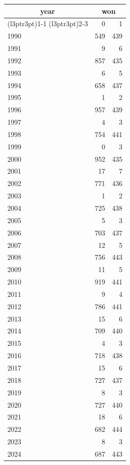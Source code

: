 \footnotesize\begin{tabular}[t]{lrr}
\toprule
\multicolumn{1}{c}{year} & \multicolumn{2}{c}{won} \\
\cmidrule(l{3pt}r{3pt}){1-1} \cmidrule(l{3pt}r{3pt}){2-3}
  & 0 & 1\\
\midrule
1990 & 549 & 439\\
1991 & 9 & 6\\
1992 & 857 & 435\\
1993 & 6 & 5\\
1994 & 658 & 437\\
1995 & 1 & 2\\
1996 & 957 & 439\\
1997 & 4 & 3\\
1998 & 754 & 441\\
1999 & 0 & 3\\
2000 & 952 & 435\\
2001 & 17 & 7\\
2002 & 771 & 436\\
2003 & 1 & 2\\
2004 & 725 & 438\\
2005 & 5 & 3\\
2006 & 703 & 437\\
2007 & 12 & 5\\
2008 & 756 & 443\\
2009 & 11 & 5\\
2010 & 919 & 441\\
2011 & 9 & 4\\
2012 & 786 & 441\\
2013 & 15 & 6\\
2014 & 709 & 440\\
2015 & 4 & 3\\
2016 & 718 & 438\\
2017 & 15 & 6\\
2018 & 727 & 437\\
2019 & 8 & 3\\
2020 & 727 & 440\\
2021 & 18 & 6\\
2022 & 682 & 444\\
2023 & 8 & 3\\
2024 & 687 & 443\\
\bottomrule
\end{tabular}

